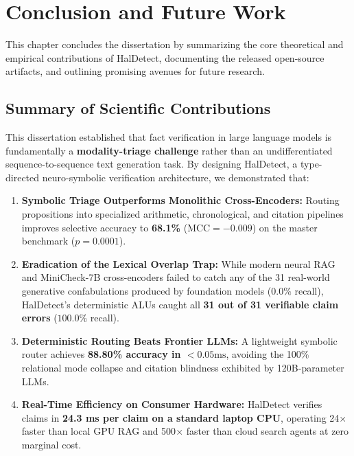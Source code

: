 \chapter{Conclusion and Future Work}
\label{ch:conclusion}

This chapter concludes the dissertation by summarizing the core theoretical and empirical contributions of HalDetect, documenting the released open-source artifacts, and outlining promising avenues for future research.

\section{Summary of Scientific Contributions}
\label{sec:conclusion_summary}

This dissertation established that fact verification in large language models is fundamentally a \textbf{modality-triage challenge} rather than an undifferentiated sequence-to-sequence text generation task. By designing HalDetect, a type-directed neuro-symbolic verification architecture, we demonstrated that:
\begin{enumerate}
    \item \textbf{Symbolic Triage Outperforms Monolithic Cross-Encoders:} Routing propositions into specialized arithmetic, chronological, and citation pipelines improves selective accuracy to \textbf{68.1\%} ($\text{MCC} = -0.009$) on the master benchmark ($p = 0.0001$).
    \item \textbf{Eradication of the Lexical Overlap Trap:} While modern neural RAG and MiniCheck-7B cross-encoders failed to catch any of the 31 real-world generative confabulations produced by foundation models ($0.0\%$ recall), HalDetect's deterministic ALUs caught all \textbf{31 out of 31 verifiable claim errors} ($100.0\%$ recall).
    \item \textbf{Deterministic Routing Beats Frontier LLMs:} A lightweight symbolic router achieves \textbf{88.80\% accuracy in $< 0.05\text{ms}$}, avoiding the 100\% relational mode collapse and citation blindness exhibited by 120B-parameter LLMs.
    \item \textbf{Real-Time Efficiency on Consumer Hardware:} HalDetect verifies claims in \textbf{24.3 ms per claim on a standard laptop CPU}, operating 24$\times$ faster than local GPU RAG and 500$\times$ faster than cloud search agents at zero marginal cost.
\end{enumerate}

